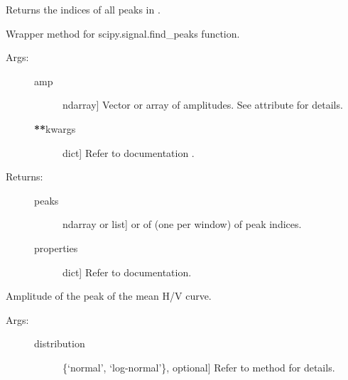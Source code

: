 \documentclass[letterpaper,10pt,english,openany,oneside]{sphinxmanual}
\begin{document}
\begin{fulllineitems}
\begin{fulllineitems}
\begin{description}
\end{description}

\end{fulllineitems}


\begin{fulllineitems}
\label{\detokenize{index:hvsrpy.Hvsr.find_peaks}}
Returns the indices of all peaks in .

Wrapper method for scipy.signal.find\_peaks function.
\begin{description}
\item[{Args:}] \leavevmode\begin{description}
\item[{amp}] \leavevmode{[}ndarray{]}
Vector or array of amplitudes. See  attribute for 
details.

\item[{{\color{red}\bfseries{}**}kwargs}] \leavevmode{[}dict{]}
Refer to  documentation
.

\end{description}

\item[{Returns:}] \leavevmode\begin{description}
\item[{peaks}] \leavevmode{[}ndarray or list{]}
 or  of  (one per window) of
peak indices.

\item[{properties}] \leavevmode{[}dict{]}
Refer to  documentation.

\end{description}

\end{description}

\end{fulllineitems}


\begin{fulllineitems}
\label{\detokenize{index:hvsrpy.Hvsr.mc_peak_amp}}
Amplitude of the peak of the mean H/V curve.
\begin{description}
\item[{Args:}] \leavevmode\begin{description}
\item[{distribution}] \leavevmode{[}\{‘normal’, ‘log-normal’\}, optional{]}
Refer to method  for details.


\end{description}
\end{description}
\end{fulllineitems}
\end{fulllineitems}
\end{document}
